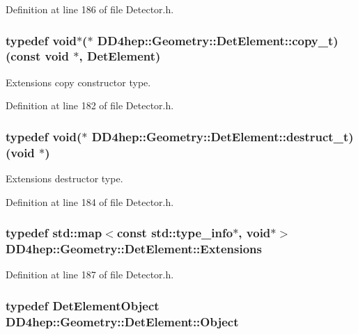 Definition at line 186 of file Detector.h.\hypertarget{class_d_d4hep_1_1_geometry_1_1_det_element_ad7efc067c799c81da218e8e153fb9fc9}{
\subsubsection[{copy\_\-t}]{\setlength{\rightskip}{0pt plus 5cm}typedef void$\ast$($\ast$ {\bf DD4hep::Geometry::DetElement::copy\_\-t})(const void $\ast$, {\bf DetElement})}}
\label{class_d_d4hep_1_1_geometry_1_1_det_element_ad7efc067c799c81da218e8e153fb9fc9}


Extensions copy constructor type. 

Definition at line 182 of file Detector.h.\hypertarget{class_d_d4hep_1_1_geometry_1_1_det_element_abeb83026451009f114bf84c285aec3c7}{
\subsubsection[{destruct\_\-t}]{\setlength{\rightskip}{0pt plus 5cm}typedef void($\ast$ {\bf DD4hep::Geometry::DetElement::destruct\_\-t})(void $\ast$)}}
\label{class_d_d4hep_1_1_geometry_1_1_det_element_abeb83026451009f114bf84c285aec3c7}


Extensions destructor type. 

Definition at line 184 of file Detector.h.\hypertarget{class_d_d4hep_1_1_geometry_1_1_det_element_aa3651ed4a11789675607a06d2f6846ff}{
\subsubsection[{Extensions}]{\setlength{\rightskip}{0pt plus 5cm}typedef std::map$<$const std::type\_\-info$\ast$, void$\ast$$>$ {\bf DD4hep::Geometry::DetElement::Extensions}}}
\label{class_d_d4hep_1_1_geometry_1_1_det_element_aa3651ed4a11789675607a06d2f6846ff}


Definition at line 187 of file Detector.h.\hypertarget{class_d_d4hep_1_1_geometry_1_1_det_element_a4e44e860d6e5827d9f42a4aea3a4f288}{
\subsubsection[{Object}]{\setlength{\rightskip}{0pt plus 5cm}typedef {\bf DetElementObject} {\bf DD4hep::Geometry::DetElement::Object}}}
\label{class_d_d4hep_1_1_geometry_1_1_det_element_a4e44e860d6e5827d9f42a4aea3a4f288}


